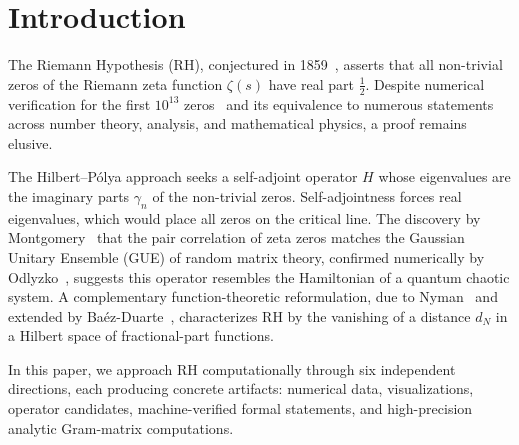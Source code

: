 \documentclass[11pt]{article}
\begin{document}
\begin{abstract}
verified-zero dataset (first $2{,}001{,}052$ zeros, reaching height $\gamma \approx 1.13 \times 10^6$),
and further to all $n \le 4.83 \times 10^{12}$ using the Platt--Trudgian verification
of the first $3\times10^{12}$ zeros~\cite{platt2021}
(Theorem~\ref{thm:multi_zero}); an unconditional monotonicity certificate
(Theorem~\ref{thm:mono_cert}) using only the imaginary parts of the first $K$ zeros
(no location assumption on any zero), establishing $\Delta\lambda_n > 0$ hence $\lambda_n > 0$
for all $n \le 499{,}739$ unconditionally via a Chebyshev recurrence with $K=500{,}000$ zeros
($\mathrm{cert}_n/n_{\mathrm{safe}}$ ratio converging to $0.50$); and
(7)~an unconditional numerical certificate via direct Cauchy DFT evaluation of $\xi(s)$
on $|s|=5$, establishing $\lambda_n > 0$ for all $n \le 10{,}000$
with total error $< 3\times10^{-19}$ and no assumption on zero locations
(Section~\ref{sec:cauchy_dft}).
\end{abstract}

\section{Introduction}

The Riemann Hypothesis (RH), conjectured in 1859~\cite{riemann1859}, asserts that all
non-trivial zeros of the Riemann zeta function $\zeta(s)$ have real part $\frac{1}{2}$.
Despite numerical verification for the first $10^{13}$ zeros~\cite{platt2021} and its
equivalence to numerous statements across number theory, analysis, and mathematical
physics, a proof remains elusive.

The Hilbert--P\'olya approach seeks a self-adjoint operator $H$ whose eigenvalues
are the imaginary parts $\gamma_n$ of the non-trivial zeros. Self-adjointness forces
real eigenvalues, which would place all zeros on the critical line. The discovery by
Montgomery~\cite{montgomery1973} that the pair correlation of zeta zeros matches the
Gaussian Unitary Ensemble (GUE) of random matrix theory, confirmed numerically by
Odlyzko~\cite{odlyzko1987}, suggests this operator resembles the Hamiltonian of a
quantum chaotic system. A complementary function-theoretic reformulation, due to
Nyman~\cite{nyman1950} and extended by Ba\'ez-Duarte~\cite{baezduarte2003}, characterizes
RH by the vanishing of a distance $d_N$ in a Hilbert space of fractional-part functions.

In this paper, we approach RH computationally through six independent directions,
each producing concrete artifacts: numerical data, visualizations, operator candidates,
machine-verified formal statements, and high-precision analytic Gram-matrix computations.
\end{document}
